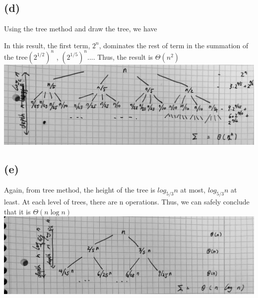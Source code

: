 \documentclass{article}
\begin{document}
\subsection*{(d)}
Using the tree method and draw the tree, we have

In this result, the first term, $2^n$, dominates the rest of term in the summation of the tree$ (2^{1/2})^n $ , $ (2^{1/5})^n ...$. 
Thus, the result is $ \Theta(n^2) $ \\
\includegraphics[width=\textwidth,height=\textheight,keepaspectratio]{tree1.jpg}
\subsection*{(e)}
Again, from tree method, the height of the tree is $log_{5/3} n$ at most, $log_{5/3} n$ at least. At each level of trees, there are n operations.
Thus, we can safely conclude that it is $\Theta(n \log n)$ \\
\includegraphics[width=\textwidth,height=\textheight,keepaspectratio]{tree2.jpg}
\end{document}
